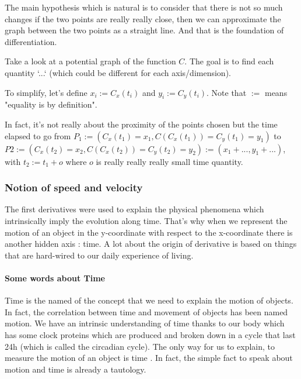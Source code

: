 \documentclass[12pt]{article}
\begin{document}
The main hypothesis which is natural is to consider that there is not so much changes if the two points are really really close, then we can approximate the graph between the two points as a straight line. And that is the foundation of differentiation.

Take a look at a potential graph of the function $C$. The goal is to find each quantity `...` (which could be different for each axis/dimension).

\begin{figure}[H]
 \centering
 
\end{figure}

To simplify, let's define $x_i:=C_x(t_i)$ and $y_i:=C_y(t_i)$. Note that $:=$ means "equality is by definition".

In fact, it's not really about the proximity of the points chosen but the time elapsed to go from $P_1:=(C_x(t_1)=x_1, C(C_x(t_1))=C_y(t_1)=y_1)$ to $P2:=(C_x(t_2)=x_2, C(C_x(t_2))=C_y(t_2)=y_2) := (x_1+..., y_1+...)$, with $t_2 := t_1 + o$ where $o$ is really really really small time quantity. 

\subsubsection{Notion of speed and velocity}

The first derivatives were used to explain the physical phenomena which intrinsically imply the evolution along time. That's why when we represent the motion of an object in the y-coordinate with respect to the x-coordinate there is another hidden axis : time.
\newline
A lot about the origin of derivative is based on things that are hard-wired to our daily experience of living.


\paragraph{Some words about Time}


Time is the named of the concept that we need to explain the motion of objects. In fact, the correlation between time and movement of objects has been named motion.
We have an intrinsic understanding of time thanks to our body which has some clock proteins \cite{web_clock_proteins} which are  produced and broken down in a cycle that last 24h (which is called the circadian cycle). The only way for us to explain, to measure the motion of an object is time \cite{web_aristotle_motion_time}. In fact, the simple fact to speak about motion and time is already a tautology.
\end{document}
